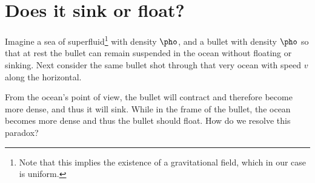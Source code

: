 \section{Does it sink or float?}
	Imagine a sea of superfluid\footnote{Note that this implies the existence of 
	a gravitational field, which in our case is uniform.} with density $\pho$,
	 and a bullet with density $\pho$ so that at rest the bullet can remain 
	suspended in the ocean without floating or sinking. Next consider the same 
	bullet shot through that very ocean with speed $v$ along the horizontal.

	From the ocean's point of view, the bullet will contract and therefore 
	become more dense, and thus it will sink. While in the frame of the bullet, 
	the ocean becomes more dense and thus the bullet should float. How do we
	resolve this paradox?